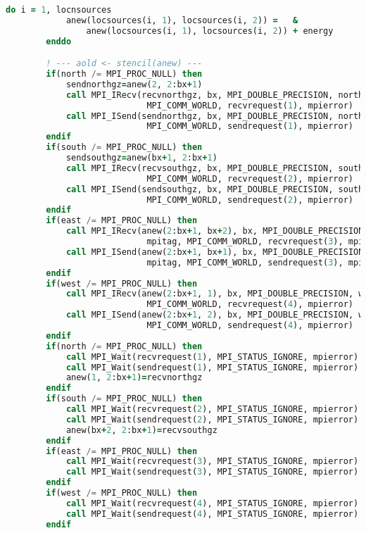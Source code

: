 \begin{lstlisting}[language=Fortran, caption={Parallel F90 implementation of the stencil test case.}]
        do i = 1, locnsources
            anew(locsources(i, 1), locsources(i, 2)) =   &
                anew(locsources(i, 1), locsources(i, 2)) + energy
        enddo

        ! --- aold <- stencil(anew) ---
        if(north /= MPI_PROC_NULL) then 
            sendnorthgz=anew(2, 2:bx+1)
            call MPI_IRecv(recvnorthgz, bx, MPI_DOUBLE_PRECISION, north, mpitag,  &
                            MPI_COMM_WORLD, recvrequest(1), mpierror)
            call MPI_ISend(sendnorthgz, bx, MPI_DOUBLE_PRECISION, north, mpitag,  &
                            MPI_COMM_WORLD, sendrequest(1), mpierror)
        endif
        if(south /= MPI_PROC_NULL) then 
            sendsouthgz=anew(bx+1, 2:bx+1)
            call MPI_IRecv(recvsouthgz, bx, MPI_DOUBLE_PRECISION, south, mpitag,  &
                            MPI_COMM_WORLD, recvrequest(2), mpierror)   
            call MPI_ISend(sendsouthgz, bx, MPI_DOUBLE_PRECISION, south, mpitag,  &
                            MPI_COMM_WORLD, sendrequest(2), mpierror)
        endif
        if(east /= MPI_PROC_NULL) then 
            call MPI_IRecv(anew(2:bx+1, bx+2), bx, MPI_DOUBLE_PRECISION, east,  &
                            mpitag, MPI_COMM_WORLD, recvrequest(3), mpierror)
            call MPI_ISend(anew(2:bx+1, bx+1), bx, MPI_DOUBLE_PRECISION, east,  &
                            mpitag, MPI_COMM_WORLD, sendrequest(3), mpierror)
        endif
        if(west /= MPI_PROC_NULL) then 
            call MPI_IRecv(anew(2:bx+1, 1), bx, MPI_DOUBLE_PRECISION, west, mpitag,  &
                            MPI_COMM_WORLD, recvrequest(4), mpierror)
            call MPI_ISend(anew(2:bx+1, 2), bx, MPI_DOUBLE_PRECISION, west, mpitag,  &
                            MPI_COMM_WORLD, sendrequest(4), mpierror)
        endif
        if(north /= MPI_PROC_NULL) then 
            call MPI_Wait(recvrequest(1), MPI_STATUS_IGNORE, mpierror)
            call MPI_Wait(sendrequest(1), MPI_STATUS_IGNORE, mpierror)
            anew(1, 2:bx+1)=recvnorthgz
        endif
        if(south /= MPI_PROC_NULL) then 
            call MPI_Wait(recvrequest(2), MPI_STATUS_IGNORE, mpierror)
            call MPI_Wait(sendrequest(2), MPI_STATUS_IGNORE, mpierror)
            anew(bx+2, 2:bx+1)=recvsouthgz
        endif
        if(east /= MPI_PROC_NULL) then 
            call MPI_Wait(recvrequest(3), MPI_STATUS_IGNORE, mpierror)
            call MPI_Wait(sendrequest(3), MPI_STATUS_IGNORE, mpierror)
        endif
        if(west /= MPI_PROC_NULL) then 
            call MPI_Wait(recvrequest(4), MPI_STATUS_IGNORE, mpierror)
            call MPI_Wait(sendrequest(4), MPI_STATUS_IGNORE, mpierror)
        endif


\end{lstlisting}
